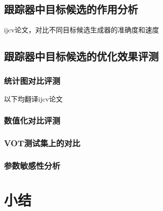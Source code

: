 \subsection{跟踪器中目标候选的作用分析}
ijcv论文，对比不同目标候选生成器的准确度和速度

\subsection{跟踪器中目标候选的优化效果评测}
\subsubsection{统计图对比评测}
以下均翻译ijcv论文
\subsubsection{数值化对比评测}
\subsubsection{VOT测试集上的对比}
\subsubsection{参数敏感性分析}

\section{小结}